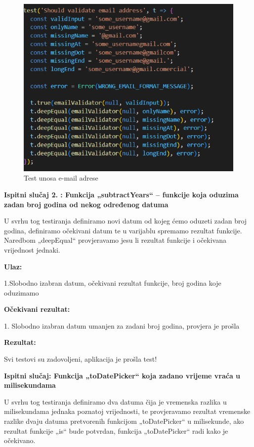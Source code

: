 	\begin{figure}[H]
			\includegraphics[scale=0.5]{slike/EmailTest.PNG} %
			\centering
			\caption{Test unosa e-mail adrese}
			\label{fig:ppp}
			
		\end{figure}

 \textbf{Ispitni slučaj 2. : Funkcija „subtractYears“ – funkcije koja oduzima zadan broj godina od nekog određenog datuma}

U svrhu tog testiranja definiramo novi datum od kojeg ćemo oduzeti zadan broj godina, definiramo očekivani datum te u varijablu spremamo rezultat funkcije. Naredbom „deepEqual“ provjeravamo jesu li rezultat funkcije i očekivana vrijednost jednaki. 

\textbf{Ulaz:}

	1.Slobodno izabran datum, očekivani rezultat funkcije, broj godina koje oduzimamo

 \textbf{Očekivani rezultat:} 

	1. Slobodno izabran datum umanjen za zadani broj godina, provjera je prošla

 \textbf{Rezultat:}  

Svi testovi su zadovoljeni, aplikacija je prošla test!



\textbf{Ispitni slučaj: Funkcija „toDatePicker“ koja zadano vrijeme vraća u milisekundama}

U svrhu tog testiranja definiramo dva datuma čija je vremenska razlika u milisekundama jednaka poznatoj vrijednosti, te provjeravamo rezultat vremenske razlike dvaju datuma pretvorenih funkcijom „toDatePicker“ u milisekunde, ako rezultat funkcije „is“ bude potvrdan, funkcija „toDatePicker“ radi kako je očekivano.

